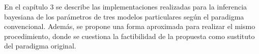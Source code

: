 En el capítulo 3 se describe las implementaciones realizadas para la inferencia bayesiana de los parámetros de tres modelos particulares según el paradigma convencional. Además, se propone una forma aproximada para realizar el mismo procedimiento, donde se cuestiona la factibilidad de la propuesta como sustituto del paradigma original.


































